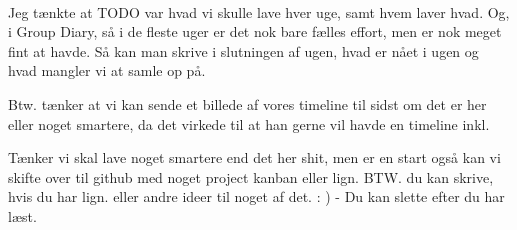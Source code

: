 \documentclass[12pt]{report}
\begin{document}
\ls\\{\color{red} Jeg tænkte at TODO var hvad vi skulle lave hver uge, samt hvem laver hvad. Og, i Group Diary, så i de fleste uger er det nok bare fælles effort, men er nok meget fint at havde. Så kan man skrive i slutningen af ugen, hvad er nået i ugen og hvad mangler vi at samle op på. 

Btw. tænker at vi kan sende et billede af vores timeline til sidst om det er her eller noget smartere, da det virkede til at han gerne vil havde en timeline inkl.

Tænker vi skal lave noget smartere end det her shit, men er en start også kan vi skifte over til github med noget project kanban eller lign. BTW. du kan skrive, hvis du har lign. eller andre ideer til noget af det. : ) - Du kan slette efter du har læst.}\ls








\end{document}
